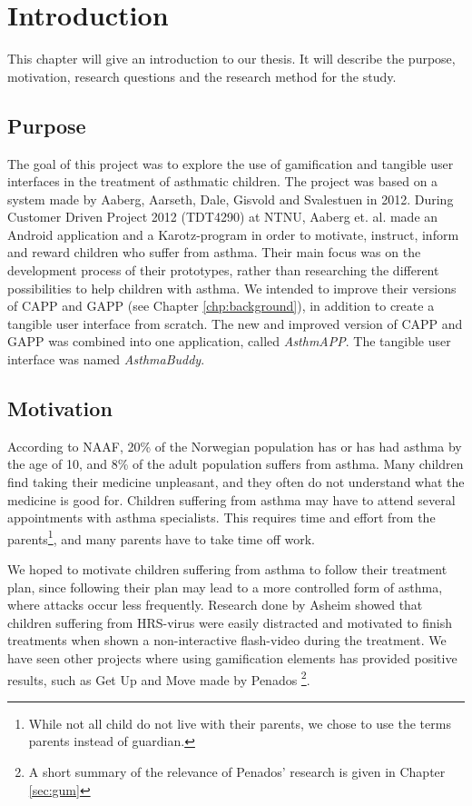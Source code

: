 \chapter{Introduction}
\label{chp:introduction}

This chapter will give an introduction to our thesis. It will describe the purpose, motivation, research questions and the research method for the study. 

\section{Purpose}
\label{sec:purpose}
The goal of this project was to explore the use of gamification and tangible user interfaces in the treatment of asthmatic children. The project was based on a system made by Aaberg, Aarseth, Dale, Gisvold and Svalestuen in 2012\cite{CustomerDriven}. During Customer Driven Project 2012 (TDT4290) at NTNU, Aaberg et. al. made an Android application and a Karotz-program in order to motivate, instruct, inform and reward children who suffer from asthma. Their main focus was on the development process of their prototypes, rather than researching the different possibilities to help children with asthma.
We intended to improve their versions of CAPP and GAPP (see Chapter \ref{chp:background}), in addition to create a tangible user interface from scratch. The new and improved version of CAPP and GAPP was combined into one application, called \emph{AsthmAPP}. The tangible user interface was named \emph{AsthmaBuddy}.  
 

\section{Motivation}
\label{sec:motivation}

According to NAAF, 20\% of the Norwegian population has or has had asthma by the age of 10, and 8\% of the adult population suffers from asthma\cite{NAAFStat}. Many children find taking their medicine unpleasant, and they often do not understand what the medicine is good for. Children suffering from asthma may have to attend several appointments with asthma specialists. This requires time and effort from the parents\footnote{While not all child do not live with their parents, we chose to use the terms parents instead of guardian.}, and many parents have to take time off work. 

We hoped to motivate children suffering from asthma to follow their treatment plan, since following their plan may lead to a more controlled form of asthma, where attacks occur less frequently\cite{ginasthma}. 
Research done by Asheim showed that children suffering from HRS-virus were easily distracted and motivated to finish treatments when shown a non-interactive flash-video during the treatment\cite{asheim2012konsept}. We have seen other projects where using gamification elements has provided positive results, such as Get Up and Move made by Penados \etal{}\cite{penadosget}\footnote{A short summary of the relevance of Penados' research is given in Chapter \ref{sec:gum}}. 


